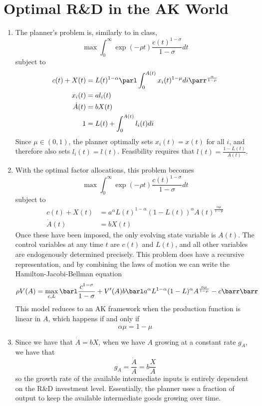 \documentclass[10pt]{article}
\begin{document}
\newpage

\section*{Optimal R\&D in the AK World}

\begin{enumerate}
	\item The planner's problem is, similarly to in class, \[\max \int_0^\infty \exp(-\rho t) \frac{c(t)^{1-\sigma}}{1-\sigma}dt\]subject to\begin{align*} c(t) + X(t) &= L(t)^{1-\alpha} \parl \int_0^{A(t)} x_i(t)^{1-\mu}di\parr^{\frac{\alpha}{1-\mu}} \\x_i(t) &= al_i(t) \\ \dot{A}(t) &= bX(t) \\1 &= L(t) + \int_0^{A(t)}l_i(t)di \end{align*}Since $\mu \in (0,1)$, the planner optimally sets $x_i(t) = x(t)$ for all $i$, and therefore also sets $l_i(t) = l(t)$. Feasibility requires that $l(t) = \frac{1-L(t)}{A(t)}$.
	\item With the optimal factor allocations, this problem becomes\[\max \int_0^\infty  \exp(-\rho t) \frac{c(t)^{1-\sigma}}{1-\sigma}dt\]subject to\begin{align*} c(t) + X(t) &= a^\alpha L(t)^{1-\alpha}(1-L(t))^\alpha A(t)^{\frac{\alpha\mu}{1-\mu}} \\ \dot{A}(t) &= bX(t)\end{align*}Once these have been imposed, the only evolving state variable is $A(t)$. The control variables at any time $t$ are $c(t)$ and $L(t)$, and all other variables are endogenously determined precisely. This problem does have a recursive representation, and by combining the laws of motion we can write the Hamilton-Jacobi-Bellman equation \[\rho V(A) = \max_{c,L} \barl \frac{c^{1-\sigma}}{1-\sigma} + V'(A) b \barl a^\alpha L^{1-\alpha}(1-L)^\alpha A^{\frac{\alpha\mu}{1-\mu}} - c\barr\barr\]This model reduces to an AK framework when the production function is linear in $A$, which happens if and only if \[\alpha\mu = 1-\mu\]
	\item Since we have that $\dot{A} = bX$, when we have $A$ growing at a constant rate $g_A$, we have that \[g_A = \frac{\dot{A}}{A} = b\frac{X}{A}\]so the growth rate of the available intermediate inputs is entirely dependent on the R\&D investment level. Essentially, the planner uses a fraction of output to keep the available intermediate goods growing over time.

\end{enumerate}
\end{document}
